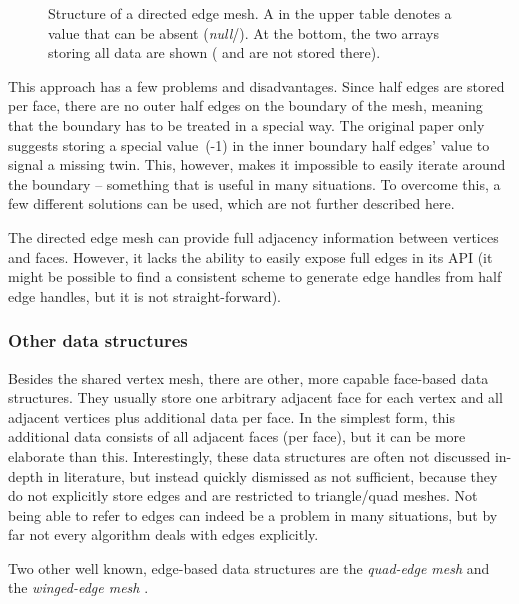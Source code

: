 \begin{figure}[b!]
  \vspace{2mm}

  \caption{
    Structure of a directed edge mesh.
    A  in the upper table denotes a value that can be absent (\emph{null}/).
    At the bottom, the two arrays storing all data are shown ( and  are not stored there).
  }
  \label{fig:dem-structure}
\end{figure}

This approach has a few problems and disadvantages.
Since half edges are stored per face, there are no outer half edges on the boundary of the mesh, meaning that the boundary has to be treated in a special way.
The original paper only suggests storing a special value~(-1) in the inner boundary half edges'  value to signal a missing twin.
This, however, makes it impossible to easily iterate around the boundary -- something that is useful in many situations.
To overcome this, a few different solutions can be used, which are not further described here.

The directed edge mesh can provide full adjacency information between vertices and faces.
However, it lacks the ability to easily expose full edges in its API (it might be possible to find a consistent scheme to generate edge handles from half edge handles, but it is not straight-forward).

\subsubsection*{Other data structures}

Besides the shared vertex mesh, there are other, more capable face-based data structures.
They usually store one arbitrary adjacent face for each vertex and all adjacent vertices plus additional data per face.
In the simplest form, this additional data consists of all adjacent faces (per face), but it can be more elaborate than this.
Interestingly, these data structures are often not discussed in-depth in literature, but instead quickly dismissed as not sufficient, because they do not explicitly store edges and are restricted to triangle/quad meshes.
Not being able to refer to edges can indeed be a problem in many situations, but by far not every algorithm deals with edges explicitly.

Two other well known, edge-based data structures are the \emph{quad-edge mesh} \cite{guibas1985primitives} and the \emph{winged-edge mesh} \cite{baumgart1972winged}.

